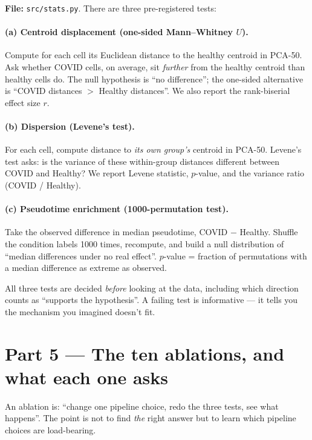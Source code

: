 \documentclass[11pt]{article}
\begin{document}
\textbf{File:} \texttt{src/stats.py}. There are three pre-registered tests:

\paragraph{(a) Centroid displacement (one-sided Mann--Whitney $U$).}
Compute for each cell its Euclidean distance to the healthy centroid in PCA-50.
Ask whether COVID cells, on average, sit \emph{further} from the healthy
centroid than healthy cells do. The null hypothesis is ``no difference''; the
one-sided alternative is ``COVID distances $>$ Healthy distances''. We also
report the rank-biserial effect size $r$.

\paragraph{(b) Dispersion (Levene's test).}
For each cell, compute distance to \emph{its own group's} centroid in PCA-50.
Levene's test asks: is the variance of these within-group distances different
between COVID and Healthy? We report Levene statistic, $p$-value, and the
variance ratio (COVID / Healthy).

\paragraph{(c) Pseudotime enrichment (1000-permutation test).}
Take the observed difference in median pseudotime, COVID $-$ Healthy. Shuffle
the condition labels 1000 times, recompute, and build a null distribution of
``median differences under no real effect''. $p$-value = fraction of
permutations with a median difference as extreme as observed.

\begin{resultbox}
All three tests are decided \emph{before} looking at the data, including
which direction counts as ``supports the hypothesis''. A failing test is
informative --- it tells you the mechanism you imagined doesn't fit.
\end{resultbox}

\section{Part 5 --- The ten ablations, and what each one asks}

An ablation is: ``change one pipeline choice, redo the three tests, see what
happens''. The point is not to find \emph{the} right answer but to learn
which pipeline choices are load-bearing.
\end{document}
